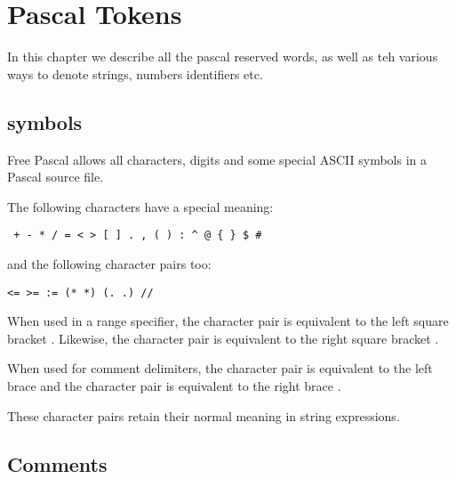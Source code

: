 \documentclass{report}
\begin{document}
\chapter{Pascal Tokens}
In this chapter we describe all the pascal reserved words, as well as teh
various ways to denote strings, numbers identifiers etc.

\section{symbols}
Free Pascal allows all characters, digits and some special ASCII symbols
in a Pascal source file.



The following characters have a special meaning:
\begin{verbatim}
 + - * / = < > [ ] . , ( ) : ^ @ { } $ #
\end{verbatim}
and the following character pairs too:
\begin{verbatim}
<= >= := (* *) (. .) // 
\end{verbatim}
When used in a range specifier, the character pair  is equivalent to 
the left square bracket \var{[}. Likewise, the character pair  is 
equivalent to the right square bracket \var{]}. 

When used for comment delimiters, the character pair \var{(*} is equivalent 
to the  left brace \var{\{} and the character pair \var{*)} is equivalent 
to the right brace \var{\}}. 

These character pairs retain their normal meaning in string expressions.
\section{Comments}
\end{document}
